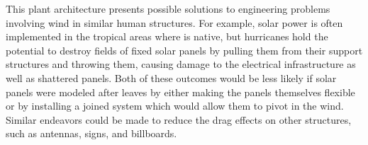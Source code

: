 This plant architecture presents possible solutions to engineering problems involving wind in similar human structures. For example, solar power is often implemented in the tropical areas where \Cxparadisi is native, but hurricanes hold the potential to destroy fields of fixed solar panels by pulling them from their support structures and throwing them, causing damage to the electrical infrastructure as well as shattered panels. Both of these outcomes would be less likely if solar panels were modeled after \Cxparadisi leaves by either making the panels themselves flexible or by installing a joined system which would allow them to pivot in the wind. Similar endeavors could be made to reduce the drag effects on other structures, such as antennas, signs, and billboards.

